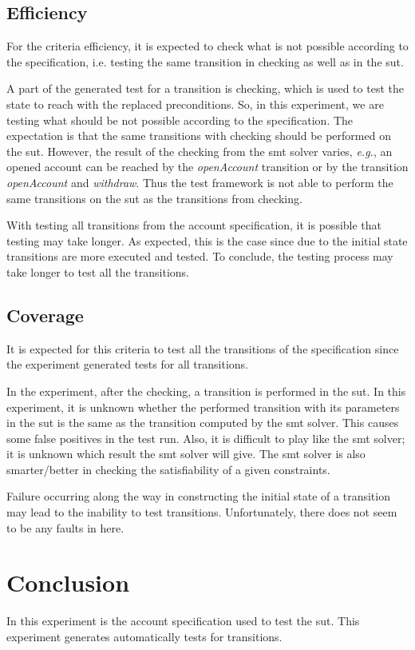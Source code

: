 \subsection{Efficiency}
For the criteria efficiency, it is expected to check what is not possible
according to the specification, i.e. testing the same transition in checking as
well as in the \gls{sut}.

A part of the generated test for a transition is checking, which is used to test
the state to reach with the replaced preconditions. So, in this experiment, we
are testing what should be not possible according to the
specification. The expectation is that the same transitions with checking should
be performed on the \gls{sut}. However, the result of the checking from the
\gls{smt} solver varies, \textit{e.g.}, an opened account can be reached by the
\textit{openAccount} transition or by the transition \textit{openAccount} and
\textit{withdraw}. Thus the test framework is not able to perform the same
transitions on the \gls{sut} as the transitions from checking.

With testing all transitions from the account specification, it is possible that
testing may take longer. As expected, this is the case since due to the initial
state transitions are more executed and tested. To conclude, the testing process
may take longer to test all the transitions.

\subsection{Coverage}
It is expected for this criteria to test all the transitions of the
specification since the experiment generated tests for all transitions.

In the experiment, after the checking, a transition
is performed in the \gls{sut}. In this experiment, it is unknown whether the
performed transition with its parameters in the \gls{sut} is the same as the
transition computed by the \gls{smt} solver. This causes some false positives in the
test run. Also, it is difficult to play like the \gls{smt} solver; it is unknown which
result the \gls{smt} solver will give. The \gls{smt} solver is also smarter/better in checking
the satisfiability of a given constraints.

Failure occurring along the way in constructing the initial state of a transition
may lead to the inability to test transitions. Unfortunately, there does not
seem to be any faults in here.

\section{Conclusion}
In this experiment is the account specification used to test the \gls{sut}.
This experiment generates automatically tests for transitions.

